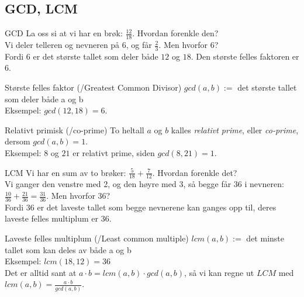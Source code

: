 \subsection*{GCD, LCM}

\begin{frame}{GCD}
    La oss si at vi har en brøk: $\frac{12}{18}$. Hvordan forenkle den?\\
    \pause
    Vi deler telleren og nevneren på 6, og får $\frac{2}{3}$. Men hvorfor 6?\\
    \pause
    Fordi 6 er det største tallet som deler både $12$ og $18$. Den største felles faktoren er 6.

    \begin{block}{Største felles faktor (/Greatest Common Divisor)}
        $gcd(a,b) := $ det største tallet som deler både a og b\\
        Eksempel: $gcd(12, 18) = 6$.
    \end{block}

    \pause
    \begin{block}{Relativt primisk (/co-prime)}
        To heltall $a$ og $b$ kalles \emph{relativt prime}, eller \emph{co-prime}, dersom $gcd(a,b)=1$.\\
        Eksempel: $8$ og $21$ er relativt prime, siden $gcd(8,21) = 1$.
    \end{block}
\end{frame}

\begin{frame}{LCM}
    Vi har en sum av to brøker: $\frac{5}{18} + \frac{7}{12}$. Hvordan forenkle det?\\
    \pause
    Vi ganger den venstre med 2, og den høyre med 3, så begge får 36 i nevneren:\\
     $\frac{10}{36} + \frac{21}{36} = \frac{31}{36}$. Men hvorfor 36?\\
    \pause
    Fordi 36 er det laveste tallet som begge nevnerene kan ganges opp til, deres laveste felles multiplum er 36.
    \begin{block}{Laveste felles multiplum (/Least common multiple)}
        $lcm(a,b) :=$ det minste tallet som kan deles av både a og b\\
        Eksempel: $lcm(18,12)=36$\\
        Det er alltid sant at $a \cdot b = lcm(a,b) \cdot gcd(a,b)$, så vi kan regne ut $LCM$ med $lcm(a,b) = \frac{a \cdot b}{gcd(a,b)}$.
    \end{block}
\end{frame}

